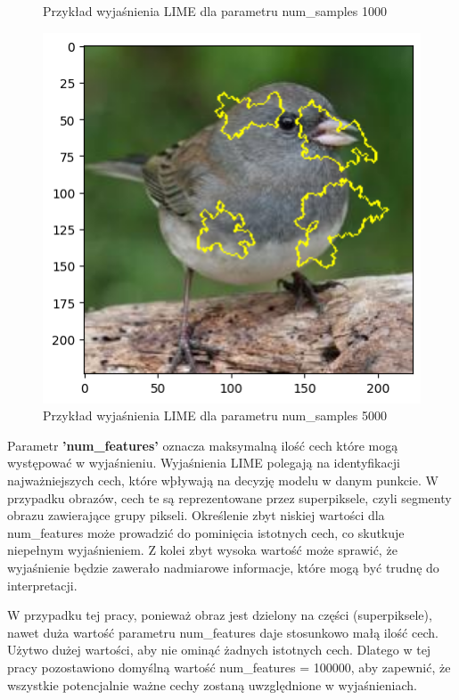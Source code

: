 \begin{figure}
\begin{minipage}[b]{0.3\textwidth}
		\caption{Przykład wyjaśnienia LIME dla parametru num\_samples 1000}  \label{rys:parameters_lime_numsamples_1000}
	\end{minipage}
	\begin{minipage}[b]{0.3\textwidth}
		\centering\includegraphics[width=.9\textwidth]{img/parameters/lime/num_samples_5000}
		\caption{Przykład wyjaśnienia LIME dla parametru num\_samples 5000}  \label{rys:parameters_lime_numsamples_5000}
	\end{minipage}
\end{figure}

Parametr \textbf{'num\_features'} oznacza maksymalną ilość cech które mogą występować w wyjaśnieniu.
Wyjaśnienia LIME polegają na identyfikacji najważniejszych cech, które wþływają na decyzję modelu w danym punkcie.
W przypadku obrazów, cech te są reprezentowane przez superpiksele, czyli segmenty obrazu zawierające grupy pikseli.
Określenie zbyt niskiej wartości dla num\_features może prowadzić do pominięcia istotnych cech, co skutkuje niepełnym wyjaśnieniem.
Z kolei zbyt wysoka wartość może sprawić, że wyjaśnienie będzie zawerało nadmiarowe informacje, które mogą być trudnę do interpretacji.

W przypadku tej pracy, ponieważ obraz jest dzielony na części (superpiksele), nawet duża wartość parametru num\_features daje stosunkowo małą ilość cech.
Użytwo dużej wartości, aby nie ominąć żadnych istotnych cech.
Dlatego w tej pracy pozostawiono domyślną wartość num\_features = 100000, aby zapewnić, że wszystkie potencjalnie ważne cechy zostaną uwzględnione w wyjaśnieniach.

